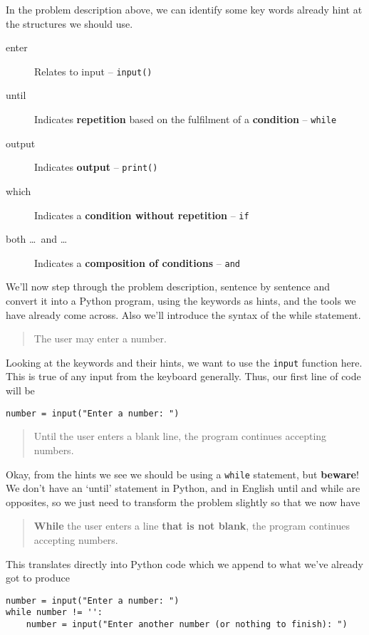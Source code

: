 In the problem description above, we can identify some key words   already hint at the structures we should use.
\begin{description}
	\item[enter] Relates to input -- \texttt{input()}
	\item[until] Indicates \textbf{repetition} based on the fulfilment    of a \textbf{condition} -- \texttt{while} 
	\item[output] Indicates \textbf{output} -- \texttt{print()}
	\item[which] Indicates a \textbf{condition without repetition} -- \texttt{if}    
        \item[both \ldots\ and \ldots] Indicates a \textbf{composition of conditions} -- \texttt{and}    
\end{description}

We'll now step through the problem description, sentence by sentence   and convert it into a Python program, using the keywords as hints, and   the tools we have already come across. Also we'll introduce the syntax   of the while statement.
\begin{quotation}    The user may enter a number.   
\end{quotation}

Looking at the keywords and their hints, we want to use the   \texttt{input} function here. This is true of any input from the keyboard generally.   Thus, our first line of code will be
\begin{lstlisting}
number = input("Enter a number: ")
\end{lstlisting}
\begin{quotation}    Until the user enters a blank line, the program continues accepting numbers.   
\end{quotation}

Okay, from the hints we see we should be using a \texttt{while} statement,   but \textbf{beware}! We don't have an `until' statement in   Python, and in English until and while are opposites, so we just need   to transform the problem slightly so that we now have
\begin{quotation}\textbf{While} the user enters a line \textbf{that is not    blank}, the program continues accepting numbers.    
\end{quotation}

This translates directly into Python code which we append to what   we've already got to produce
\begin{lstlisting}
number = input("Enter a number: ")
while number != '':
    number = input("Enter another number (or nothing to finish): ")
\end{lstlisting}

